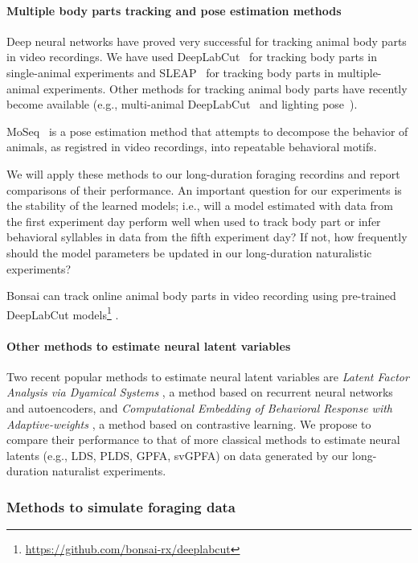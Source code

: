 \paragraph{Multiple body parts tracking and pose estimation methods}

Deep neural networks have proved very successful for tracking animal body parts
in video recordings.
%
We have used DeepLabCut~\citep{mathisEtAl18} for tracking body parts in
single-animal experiments and SLEAP~\citep{pereiraEtAl22} for tracking body
parts in multiple-animal experiments. Other methods for tracking animal body parts have
recently become available (e.g., multi-animal DeepLabCut~\citep{lauerEtAl22}
and lighting pose~\citep{bidermanEtAl23}).

MoSeq~\cite{wiltschkoEtAl15} is a pose estimation method that attempts to
decompose the behavior of animals, as registred in video recordings, into
repeatable behavioral motifs.

We will apply these methods to our long-duration foraging recordins and report
comparisons of their performance. An important question for our experiments is
the stability of the learned models; i.e., will a model estimated with data
from the first experiment day perform well when used to track body part or
infer behavioral syllables in data from the fifth experiment day? If not, how
frequently should the model parameters be updated in our long-duration
naturalistic experiments?

Bonsai can track online animal body parts in video recording using pre-trained
DeepLabCut models\footnote{\url{https://github.com/bonsai-rx/deeplabcut}}
\citep{kaneEtAl20}.

\paragraph{Other methods to estimate neural latent variables}

Two recent popular methods to estimate neural latent variables are \emph{Latent
Factor Analysis via Dyamical Systems} \citep[LFADS][]{pandarinathEtAl18}, a
method based on recurrent neural networks and autoencoders, and
\emph{Computational Embedding of Behavioral Response with Adaptive-weights}
\citep[CEBRA]{schneiderEtAl23}, a method based on contrastive learning. We
propose to compare their performance to that of more classical methods to
estimate neural latents (e.g., LDS, PLDS, GPFA, svGPFA) on data generated by
our long-duration naturalist experiments.

\subsubsection{Methods to simulate foraging data}

